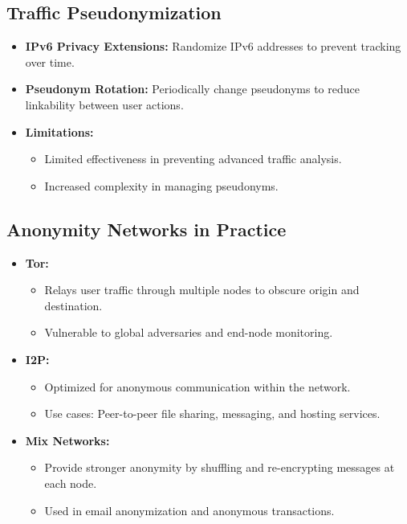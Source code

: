 \documentclass{article}
\begin{document}
\subsection{Traffic Pseudonymization}
\begin{itemize}
    \item \textbf{IPv6 Privacy Extensions:} Randomize IPv6 addresses to prevent tracking over time.
    \item \textbf{Pseudonym Rotation:} Periodically change pseudonyms to reduce linkability between user actions.
    \item \textbf{Limitations:}
    \begin{itemize}
        \item Limited effectiveness in preventing advanced traffic analysis.
        \item Increased complexity in managing pseudonyms.
    \end{itemize}
\end{itemize}

\subsection{Anonymity Networks in Practice}
\begin{itemize}
    \item \textbf{Tor:}
    \begin{itemize}
        \item Relays user traffic through multiple nodes to obscure origin and destination.
        \item Vulnerable to global adversaries and end-node monitoring.
    \end{itemize}
    \item \textbf{I2P:}
    \begin{itemize}
        \item Optimized for anonymous communication within the network.
        \item Use cases: Peer-to-peer file sharing, messaging, and hosting services.
    \end{itemize}
    \item \textbf{Mix Networks:}
    \begin{itemize}
        \item Provide stronger anonymity by shuffling and re-encrypting messages at each node.
        \item Used in email anonymization and anonymous transactions.
    \end{itemize}
\end{itemize}
\end{document}
